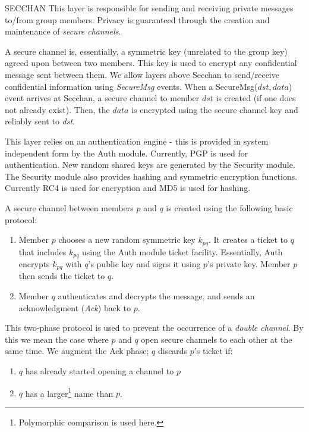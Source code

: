 \begin{Layer}{SECCHAN}
\label{layer:secchan}
This layer is responsible for sending and receiving private messages 
to/from group members. Privacy is guaranteed through the creation and
maintenance of {\it secure channels}. 

A secure channel is, essentially, a symmetric key (unrelated to the group key)
agreed upon between two members. This key is used to encrypt any
confidential message sent between them. We allow layers above 
Secchan to send/receive confidential information using
{\it SecureMsg} events. When a SecureMsg($dst,data$) event arrives at
Secchan, a secure channel to member $dst$ is created (if one does
not already exist). Then, the $data$ is encrypted using the secure channel key
and reliably sent to {\it dst}.

This layer relies on an authentication engine - this is provided in
system independent form by the Auth module. Currently, PGP is used for
authentication. New random shared keys are generated by the
Security module. The Security module also provides hashing and
symmetric encryption functions. Currently RC4 is used for encryption
and MD5 is used for hashing. 

\begin{Protocol}
A secure channel between members $p$ and $q$ is created using the
following basic protocol:
\begin{enumerate}
\item 
Member $p$ chooses a new random symmetric key $k_{pq}$.  It creates a
ticket to $q$ that includes $k_{pq}$ using the Auth module ticket
facility. Essentially, Auth encrypts $k_{pq}$ with $q$'s public key and
signs it using $p$'s private key. Member $p$ then sends the ticket to $q$.
\item 
Member $q$ authenticates and decrypts the message, and sends an
acknowledgment ({\it Ack}) back to $p$.
\end{enumerate}

This two-phase protocol is used to prevent the occurrence of a {\it
double channel}. By this we mean the case where $p$ and $q$ open
secure channels to each other at the same time. We augment the Ack phase;
$q$ discards $p$'s ticket if:
\begin{enumerate} 
\item $q$ has already started opening a channel to $p$
\item $q$ has a larger\footnote{Polymorphic comparison is used here.} name
than $p$.
\end{enumerate}


\end{Protocol}
\end{Layer}
